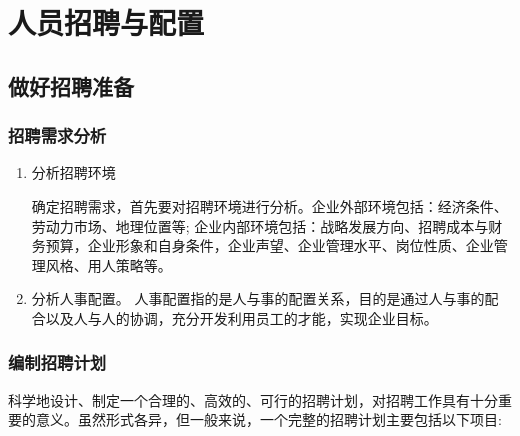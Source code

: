 \section {人员招聘与配置}

\subsection {做好招聘准备}

\subsubsection {招聘需求分析}

    \begin{enumerate}
        \item 分析招聘环境

        确定招聘需求，首先要对招聘环境进行分析。企业外部环境包括：经济条件、劳动力市场、地理位置等; 企业内部环境包括：战略发展方向、招聘成本与财务预算，企业形象和自身条件，企业声望、企业管理水平、岗位性质、企业管理风格、用人策略等。

        \item 分析人事配置。
        人事配置指的是人与事的配置关系，目的是通过人与事的配合以及人与人的协调，充分开发利用员工的才能，实现企业目标。
    \end{enumerate}

\subsubsection {编制招聘计划}

    科学地设计、制定一个合理的、高效的、可行的招聘计划，对招聘工作具有十分重要的意义。虽然形式各异，但一般来说，一个完整的招聘计划主要包括以下项目:

